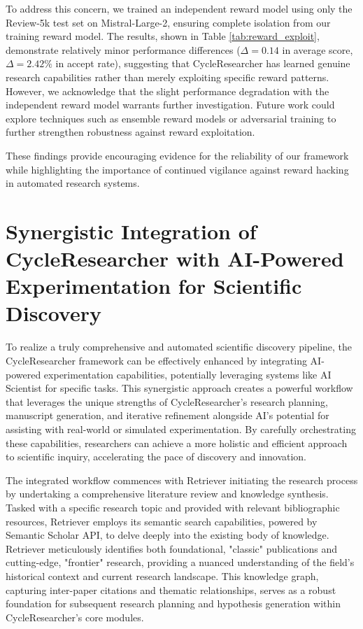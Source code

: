 \documentclass{article} %
\begin{document}
To address this concern, we trained an independent reward model using only the Review-5k test set on Mistral-Large-2, ensuring complete isolation from our training reward model. The results, shown in Table \ref{tab:reward_exploit}, demonstrate relatively minor performance differences ($\Delta = 0.14$ in average score, $\Delta = 2.42\%$ in accept rate), suggesting that CycleResearcher has learned genuine research capabilities rather than merely exploiting specific reward patterns. However, we acknowledge that the slight performance degradation with the independent reward model warrants further investigation. Future work could explore techniques such as ensemble reward models or adversarial training to further strengthen robustness against reward exploitation.

These findings provide encouraging evidence for the reliability of our framework while highlighting the importance of continued vigilance against reward hacking in automated research systems.

\section{Synergistic Integration of CycleResearcher with AI-Powered Experimentation for Scientific Discovery}
\label{app:inference}

To realize a truly comprehensive and automated scientific discovery pipeline, the CycleResearcher framework can be effectively enhanced by integrating AI-powered experimentation capabilities, potentially leveraging systems like AI Scientist  \citep{lu2024ai} for specific tasks. This synergistic approach creates a powerful workflow that leverages the unique strengths of CycleResearcher's research planning, manuscript generation, and iterative refinement alongside AI's potential for assisting with real-world or simulated experimentation. By carefully orchestrating these capabilities, researchers can achieve a more holistic and efficient approach to scientific inquiry, accelerating the pace of discovery and innovation.

The integrated workflow commences with Retriever initiating the research process by undertaking a comprehensive literature review and knowledge synthesis. Tasked with a specific research topic and provided with relevant bibliographic resources, Retriever employs its semantic search capabilities, powered by Semantic Scholar API, to delve deeply into the existing body of knowledge.  Retriever meticulously identifies both foundational, "classic" publications and cutting-edge, "frontier" research, providing a nuanced understanding of the field's historical context and current research landscape. This knowledge graph, capturing inter-paper citations and thematic relationships, serves as a robust foundation for subsequent research planning and hypothesis generation within CycleResearcher's core modules.
\end{document}
